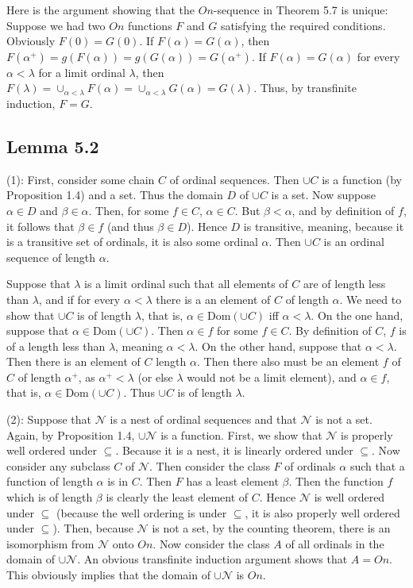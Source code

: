 \documentclass{article}
\theoremstyle{definition}
\begin{document}
Here is the argument showing that the $On$-sequence in Theorem 5.7 is unique: Suppose we had two $On$ functions $F$ and $G$ satisfying the required conditions. 
Obviously $F(0)=G(0)$. If $F(\alpha)=G(\alpha)$, then $F(\alpha^+)=g(F(\alpha))=g(G(\alpha))=G(\alpha^+)$. If $F(\alpha)=G(\alpha)$ for every 
$\alpha<\lambda$ for a limit ordinal $\lambda$, then $F(\lambda)=\cup_{\alpha<\lambda}F(\alpha)=\cup_{\alpha<\lambda}G(\alpha)=G(\lambda)$. Thus, 
by transfinite induction, $F=G$.

\subsection*{Lemma 5.2}
(1): First, consider some chain $C$ of ordinal sequences. Then $\cup C$ is a function (by Proposition 1.4) and a set. Thus the domain $D$ of $\cup C$ is a 
set. Now suppose $\alpha\in D$ and $\beta\in\alpha$. Then, for some $f\in C$, $\alpha\in C$. But $\beta<\alpha$, and by definition of $f$, it follows that 
$\beta\in f$ (and thus $\beta\in D$). Hence $D$ is transitive, meaning, because it is a transitive set of ordinals, it is also some ordinal $\alpha$. 
Then $\cup C$ is an ordinal sequence of length $\alpha$.

Suppose that $\lambda$ is a limit ordinal such that all elements of $C$ are of length less than $\lambda$, and if for every $\alpha<\lambda$ 
there is a an element of $C$ of length $\alpha$. We need to show that $\cup C$ is of length $\lambda$, that is, $\alpha\in\textrm{Dom}(\cup C)$ iff 
$\alpha<\lambda$. On the one hand, suppose that $\alpha\in\textrm{Dom}(\cup C)$. Then $\alpha\in f$ for some $f\in C$. By definition of $C$, 
$f$ is of a length less than $\lambda$, meaning $\alpha<\lambda$. On the other hand, suppose that $\alpha<\lambda$. Then there is an element 
of $C$ length $\alpha$. Then there also must be an element $f$ of $C$ of length $\alpha^+$, as $\alpha^+<\lambda$ (or else $\lambda$ would not be a limit element), 
and $\alpha\in f$, that is, $\alpha\in\textrm{Dom}(\cup C)$. Thus $\cup C$ is of length $\lambda$.

(2): Suppose that $\mathcal{N}$ is a nest of ordinal sequences and that $\mathcal{N}$ is not a set. Again, by Proposition 1.4, $\cup\mathcal{N}$ is a function.
First, we show that $\mathcal{N}$ is properly well ordered under $\subseteq$. Because it is a nest, it is linearly ordered under $\subseteq$. Now consider 
any subclass $C$ of $\mathcal{N}$. Then consider the class $F$ of ordinals $\alpha$ such that a function of length $\alpha$ is in $C$. Then $F$ has a least element 
$\beta$. Then the function $f$ which is of length $\beta$ is clearly the least element of $C$. Hence $\mathcal{N}$ is well ordered under $\subseteq$ (because 
the well ordering is under $\subseteq$, it is also properly well ordered under $\subseteq$). Then, because $\mathcal{N}$ is not a set, by the counting 
theorem, there is an isomorphism from $\mathcal{N}$ onto $On$. Now consider the class $A$ of all ordinals in the domain of $\cup\mathcal{N}$. An obvious transfinite induction 
argument shows that $A=On$. This obviously implies that the domain of $\cup\mathcal{N}$ is $On$. 
\end{document}
